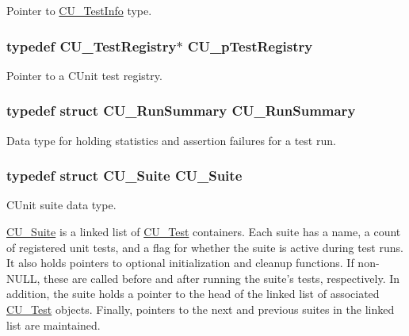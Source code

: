 Pointer to \hyperlink{structCU__TestInfo}{C\-U\-\_\-\-Test\-Info} type. 

\hypertarget{group__Framework_ga2a416821761e04581a70c41ae3587d5c}{
\subsubsection[{C\-U\-\_\-p\-Test\-Registry}]{\setlength{\rightskip}{0pt plus 5cm}typedef {\bf C\-U\-\_\-\-Test\-Registry}$\ast$ {\bf C\-U\-\_\-p\-Test\-Registry}}}\label{group__Framework_ga2a416821761e04581a70c41ae3587d5c}


Pointer to a C\-Unit test registry. 

\hypertarget{group__Framework_gaccf591ac5a134c3ba3a1becb7d469094}{
\subsubsection[{C\-U\-\_\-\-Run\-Summary}]{\setlength{\rightskip}{0pt plus 5cm}typedef struct {\bf C\-U\-\_\-\-Run\-Summary}  {\bf C\-U\-\_\-\-Run\-Summary}}}\label{group__Framework_gaccf591ac5a134c3ba3a1becb7d469094}


Data type for holding statistics and assertion failures for a test run. 

\hypertarget{group__Framework_gad58d2b18d7da9c0ae48ae1679d1b8861}{
\subsubsection[{C\-U\-\_\-\-Suite}]{\setlength{\rightskip}{0pt plus 5cm}typedef struct {\bf C\-U\-\_\-\-Suite}  {\bf C\-U\-\_\-\-Suite}}}\label{group__Framework_gad58d2b18d7da9c0ae48ae1679d1b8861}


C\-Unit suite data type. 

\hyperlink{structCU__Suite}{C\-U\-\_\-\-Suite} is a linked list of \hyperlink{structCU__Test}{C\-U\-\_\-\-Test} containers. Each suite has a name, a count of registered unit tests, and a flag for whether the suite is active during test runs. It also holds pointers to optional initialization and cleanup functions. If non-\/\-N\-U\-L\-L, these are called before and after running the suite's tests, respectively. In addition, the suite holds a pointer to the head of the linked list of associated \hyperlink{structCU__Test}{C\-U\-\_\-\-Test} objects. Finally, pointers to the next and previous suites in the linked list are maintained.\par
\par


